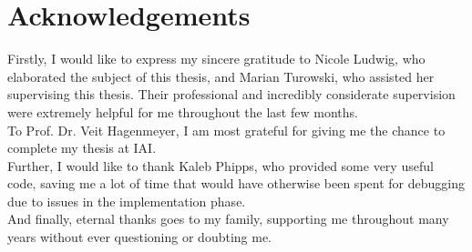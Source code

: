 \chapter*{Acknowledgements}

Firstly, I would like to express my sincere gratitude to Nicole Ludwig, who elaborated the subject of this thesis, and Marian Turowski, who assisted her supervising this thesis. Their professional and incredibly considerate supervision were extremely helpful for me throughout the last few months.\\

To Prof. Dr. Veit Hagenmeyer, I am most grateful for giving me the chance to complete my thesis at IAI.\\

Further, I would like to thank Kaleb Phipps, who provided some very useful code, saving me a lot of time that would have otherwise been spent for debugging due to issues in the implementation phase.\\

And finally, eternal thanks goes to my family, supporting me throughout many years without ever questioning or doubting me.\\

